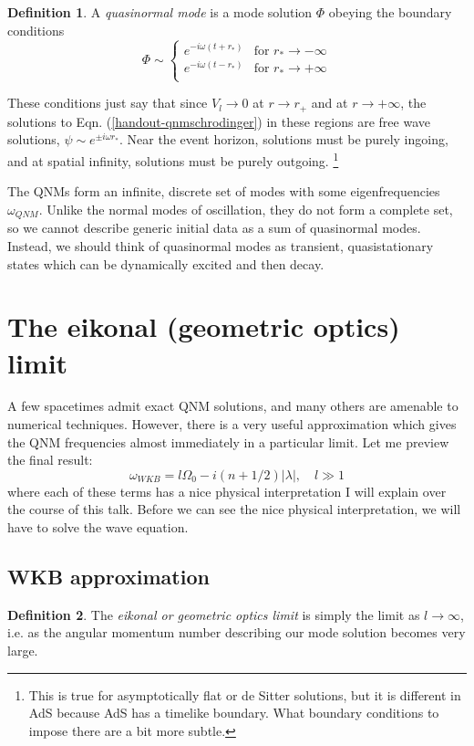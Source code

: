\documentclass{tufte-handout}
\newcommand{\?}{\overset{?}{=}}
\newcommand{\term}{\emph}
\theoremstyle{definition}
\newtheorem{defn}{Definition}
\theoremstyle{remark}
\begin{document}
\begin{defn}
    A \term{quasinormal mode} is a mode solution $\Phi$ obeying the boundary conditions
    \begin{equation}\label{handout-qnmbcs}
        \Phi \sim \begin{cases}
            e^{-i\omega (t+r_*)}& \text{for } r_* \to -\infty\\
            e^{-i\omega (t-r_*)}& \text{for } r_* \to +\infty\\
        \end{cases}
    \end{equation}
\end{defn}
These conditions just say that since $V_l \to 0$ at $r\to r_+$ and at $r\to +\infty$, the solutions to Eqn. (\ref{handout-qnmschrodinger}) in these regions are free wave solutions, $\psi \sim e^{\pm i\omega r_*}$. Near the event horizon, solutions must be purely ingoing, and at spatial infinity, solutions must be purely outgoing.%
    \footnote{This is true for asymptotically flat or de Sitter solutions, but it is different in AdS because AdS has a timelike boundary. What boundary conditions to impose there are a bit more subtle.}

The QNMs form an infinite, discrete set of modes with some eigenfrequencies $\omega_{QNM}$. Unlike the normal modes of oscillation, they do not form a complete set, so we cannot describe generic initial data as a sum of quasinormal modes. Instead, we should think of quasinormal modes as transient, quasistationary states which can be dynamically excited and then decay.

\section{The eikonal (geometric optics) limit}
A few spacetimes admit exact QNM solutions, and many others are amenable to numerical techniques. However, there is a very useful approximation which gives the QNM frequencies almost immediately in a particular limit. Let me preview the final result:
\begin{equation*}
    \omega_{WKB} = l \Omega_0 - i(n+1/2) |\lambda|, \quad l \gg 1
\end{equation*}
where each of these terms has a nice physical interpretation I will explain over the course of this talk. Before we can see the nice physical interpretation, we will have to solve the wave equation.
\subsection{WKB approximation}
\begin{defn}
    The \term{eikonal or geometric optics limit} is simply the limit as $l\to \infty$, i.e. as the angular momentum number describing our mode solution becomes very large.
\end{defn}
\end{document}
